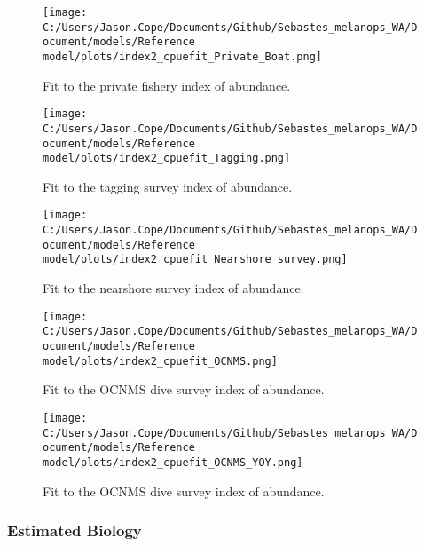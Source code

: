 \documentclass[11pt,
  letterpaper,
]{article}
\begin{document}
\pagebreak

\begin{figure}
{\centering
\texttt{[image: C:/Users/Jason.Cope/Documents/Github/Sebastes\_melanops\_WA/Document/models/Reference model/plots/index2\_cpuefit\_Private\_Boat.png]}
}
\caption{Fit to the private fishery index of abundance.\label{fig:private-index-fit}}
\end{figure}

\pagebreak

\begin{figure}
{\centering
\texttt{[image: C:/Users/Jason.Cope/Documents/Github/Sebastes\_melanops\_WA/Document/models/Reference model/plots/index2\_cpuefit\_Tagging.png]}
}
\caption{Fit to the tagging survey index of abundance.\label{fig:tag-index-fit}}
\end{figure}

\pagebreak

\begin{figure}
{\centering
\texttt{[image: C:/Users/Jason.Cope/Documents/Github/Sebastes\_melanops\_WA/Document/models/Reference model/plots/index2\_cpuefit\_Nearshore\_survey.png]}
}
\caption{Fit to the nearshore survey index of abundance.\label{fig:nearshore-index-fit}}
\end{figure}

\pagebreak

\begin{figure}
{\centering
\texttt{[image: C:/Users/Jason.Cope/Documents/Github/Sebastes\_melanops\_WA/Document/models/Reference model/plots/index2\_cpuefit\_OCNMS.png]}
}
\caption{Fit to the OCNMS dive survey index of abundance.\label{fig:ocnms-index-fit}}
\end{figure}

\pagebreak

\begin{figure}
{\centering
\texttt{[image: C:/Users/Jason.Cope/Documents/Github/Sebastes\_melanops\_WA/Document/models/Reference model/plots/index2\_cpuefit\_OCNMS\_YOY.png]}
}
\caption{Fit to the OCNMS dive survey index of abundance.\label{fig:ocnms-yoy-index-fit}}
\end{figure}

\pagebreak

\hypertarget{estimated-biology}{%
\subsubsection{Estimated Biology}\label{estimated-biology}}
\end{document}
